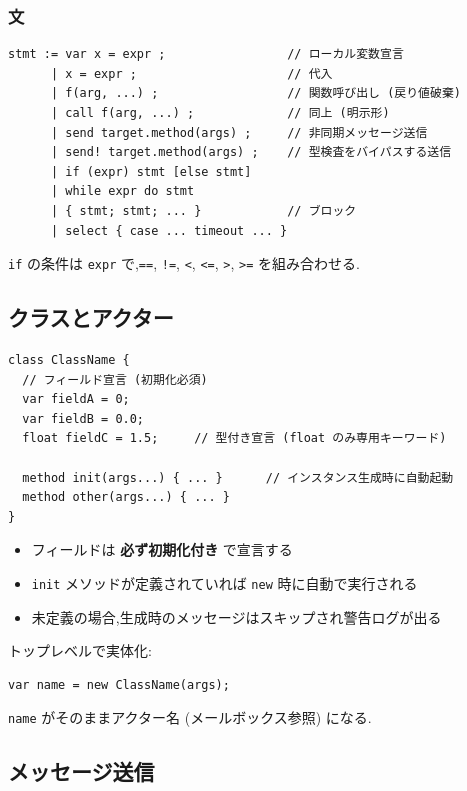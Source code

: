\documentclass[11pt,a4paper]{article}
\begin{document}
\subsubsection*{文}

\begin{lstlisting}
stmt := var x = expr ;                 // ローカル変数宣言
      | x = expr ;                     // 代入
      | f(arg, ...) ;                  // 関数呼び出し (戻り値破棄)
      | call f(arg, ...) ;             // 同上 (明示形)
      | send target.method(args) ;     // 非同期メッセージ送信
      | send! target.method(args) ;    // 型検査をバイパスする送信
      | if (expr) stmt [else stmt]
      | while expr do stmt
      | { stmt; stmt; ... }            // ブロック
      | select { case ... timeout ... }
\end{lstlisting}

\texttt{if} の条件は \texttt{expr} で,\texttt{==}, \texttt{!=}, \texttt{<}, \texttt{<=},
\texttt{>}, \texttt{>=} を組み合わせる.

\subsection{クラスとアクター}

\begin{lstlisting}
class ClassName {
  // フィールド宣言 (初期化必須)
  var fieldA = 0;
  var fieldB = 0.0;
  float fieldC = 1.5;     // 型付き宣言 (float のみ専用キーワード)

  method init(args...) { ... }      // インスタンス生成時に自動起動
  method other(args...) { ... }
}
\end{lstlisting}

\begin{itemize}
  \item フィールドは \textbf{必ず初期化付き} で宣言する
  \item \texttt{init} メソッドが定義されていれば \texttt{new} 時に自動で実行される
  \item 未定義の場合,生成時のメッセージはスキップされ警告ログが出る
\end{itemize}

トップレベルで実体化:

\begin{lstlisting}
var name = new ClassName(args);
\end{lstlisting}

\texttt{name} がそのままアクター名 (メールボックス参照) になる.

\subsection{メッセージ送信}
\end{document}
